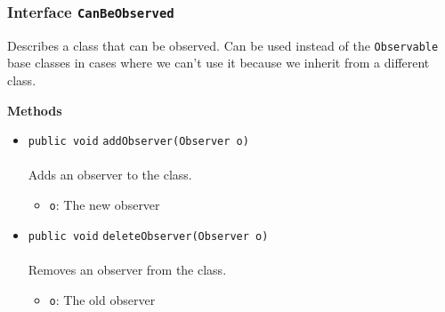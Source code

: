 \subsubsection{Interface \lstinline|CanBeObserved|}
Describes a class that can be observed. Can be used instead of the \lstinline|Observable| base classes in cases where we can't use it because we inherit
 from a different class. \\
\noindent\begin{minipage}[t]{5cm}
\vspace{0.3em}
\hspace*{2em}
\vspace{0.3em}
\end{minipage}





\textbf{\sffamily Methods}
\begin{itemize}
\item \lstinline|public void| \lstinline|addObserver|\lstinline|(Observer o)|\\ \\[-0.6em]
Adds an observer to the class.
\begin{itemize}
\item \lstinline|o|: The new observer
\end{itemize}



\item \lstinline|public void| \lstinline|deleteObserver|\lstinline|(Observer o)|\\ \\[-0.6em]
Removes an observer from the class.
\begin{itemize}
\item \lstinline|o|: The old observer
\end{itemize}



\end{itemize}


